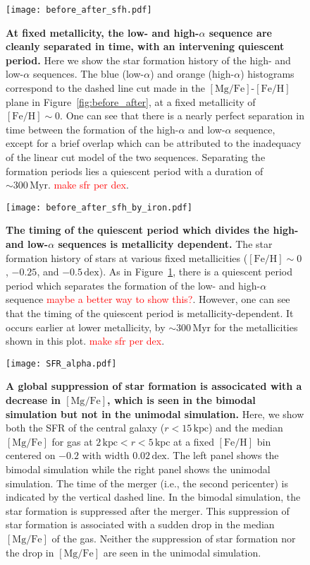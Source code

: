 \documentclass[linenumbers, twocolumn]{aastex631}
\newcommand{\Myr}{\ensuremath{\textrm{Myr}}}
\newcommand{\kpc}{\ensuremath{\textrm{kpc}}}
\newcommand{\FeH}{\ensuremath{[\textrm{Fe}/\textrm{H}]}}
\newcommand{\MgFe}{\ensuremath{[\textrm{Mg}/\textrm{Fe}]}}
\newcommand{\dex}{\ensuremath{\textrm{dex}}}
\newcommand{\red}[1]{\textcolor{red}{#1}}
\begin{document}
\begin{figure}
  \centering
  \texttt{[image: before\_after\_sfh.pdf]}
  \caption{\textbf{At fixed metallicity, the low- and high-$\alpha$ sequence are cleanly separated in time, with an intervening quiescent period.} Here we show the star formation history of the high- and low-$\alpha$ sequences. The blue (low-$\alpha$) and orange (high-$\alpha$) histograms correspond to the dashed line cut made in the \MgFe-\FeH plane in Figure~\ref{fig:before_after}, at a fixed metallicity of $\FeH\sim0$. One can see that there is a nearly perfect separation in time between the formation of the high-$\alpha$ and low-$\alpha$ sequence, except for a brief overlap which can be attributed to the inadequacy of the linear cut model of the two sequences. Separating the formation periods lies a quiescent period with a duration of $\sim300\,\Myr$. \red{make sfr per dex}.}
  \label{fig:before_after_sfh}
\end{figure}

\begin{figure}
  \centering
  \texttt{[image: before\_after\_sfh\_by\_iron.pdf]}
  \caption{\textbf{The timing of the quiescent period which divides the high- and low-$\alpha$ sequences is metallicity dependent.} The star formation history of stars at various fixed metallicities ($\FeH\sim0$, $-0.25$, and $-0.5\,\textrm{dex}$). As in Figure~\ref{fig:before_after_sfh}, there is a quiescent period period which separates the formation of the low- and high-$\alpha$ sequence \red{maybe a better way to show this?}. However, one can see that the timing of the quiescent period is metallicity-dependent. It occurs earlier at lower metallicity, by $\sim300\,\Myr$ for the metallicities shown in this plot. \red{make sfr per dex}.}
  \label{fig:before_after_sfh_by_iron}
\end{figure}

\begin{figure*}
  \centering
  \texttt{[image: SFR\_alpha.pdf]}
  \caption{\textbf{A global suppression of star formation is associcated with a decrease in \MgFe{}, which is seen in the bimodal simulation but not in the unimodal simulation.} Here, we show both the SFR of the central galaxy ($r<15\,\kpc$) and the median \MgFe{} for gas at $2\,\kpc<r<5\,\kpc$ at a fixed \FeH{} bin centered on $-0.2$ with width $0.02\,\dex$. The left panel shows the bimodal simulation while the right panel shows the unimodal simulation. The time of the merger (i.e., the second pericenter) is indicated by the vertical dashed line. In the bimodal simulation, the star formation is suppressed after the merger. This suppression of star formation is associated with a sudden drop in the median \MgFe{} of the gas. Neither the suppression of star formation nor the drop in \MgFe{} are seen in the unimodal simulation.}
  \label{fig:SFR_alpha}
\end{figure*}
\end{document}

